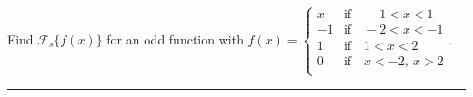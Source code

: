 \documentclass[10pt]{article}
\begin{document}
\newpage

\section{\underline{}}
\label{sec: Problem 2}
\noindent
Find $ \mathcal{F}_s\{f(x)\} $ for an odd function with $ f(x)=\left\{\begin{array}{ll}
    x & \mbox{if} \quad -1 < x < 1\\
    -1 & \mbox{if} \quad -2 < x < -1\\
    1 & \mbox{if} \quad 1 < x < 2\\
    0 & \mbox{if} \quad x < -2, \ x > 2 \\
\end{array}
\right. $.  \\
\vspace{2.5mm}
\hrule

\vspace{7.5mm}
\end{document}

